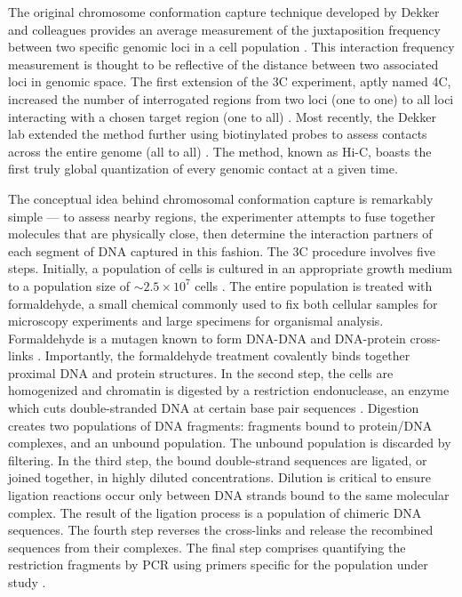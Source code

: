 The original chromosome conformation capture technique developed by Dekker and colleagues provides an average measurement of the juxtaposition frequency
between two specific genomic loci in a cell population \citep{frase2014}.  This interaction frequency measurement is thought to be reflective of
the distance between two associated loci in genomic space.  The first extension of the \gls{3C} experiment, aptly named \gls{4C}, increased
the number of interrogated regions from two loci (one to one) to all loci interacting with a chosen target region (one to all) \citep{simonis2006}.  Most
recently, the Dekker lab extended the method further using biotinylated probes to assess contacts across the entire genome (all to all) \citep{berkum2010}.
The method, known as Hi-C, boasts the first truly global quantization of every genomic contact at a given time.

The conceptual idea behind chromosomal conformation capture is remarkably simple --- to assess nearby regions, the experimenter attempts to fuse
together molecules that are physically close, then determine the interaction partners of each segment of DNA captured in this fashion.  The
\gls{3C} procedure involves five steps.   Initially, a population of cells is cultured in an appropriate growth medium to a population size
of $\sim2.5 \times 10^7$ cells \citep{berkum2010}.  The entire population is treated with formaldehyde, a small chemical commonly used to fix both
cellular samples for microscopy experiments and large specimens for organismal analysis.  Formaldehyde is a mutagen known to form DNA-DNA and
DNA-protein cross-links \citep{merk1998}.  Importantly, the formaldehyde treatment covalently binds together proximal DNA and protein structures.
In the second step, the cells are homogenized and chromatin is digested by a restriction endonuclease, an enzyme which cuts double-stranded
\gls{DNA} at certain base pair sequences \citep{berkum2010}.  Digestion creates two populations of DNA fragments: fragments bound to protein/\gls{DNA}
complexes, and an unbound population.  The unbound population is discarded by filtering.  In the third step, the bound double-strand sequences
are ligated, or joined together, in highly diluted concentrations. Dilution is critical to ensure ligation reactions occur only between DNA
strands bound to the same molecular complex. The result of the ligation process is a population of chimeric DNA sequences. The fourth step
reverses the cross-links and release the recombined sequences from their complexes.  The final step comprises quantifying the restriction
fragments by PCR using primers specific for the population under study \citep{simonis2007}.

